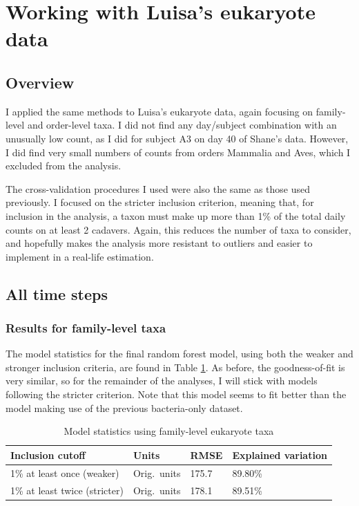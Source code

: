 \documentclass{article}
\begin{document}
\section{Working with Luisa's eukaryote data}

\subsection{Overview}

I applied the same methods to Luisa's eukaryote data, again focusing
on family-level and order-level taxa.  I did not find any day/subject
combination with an unusually low count, as I did for subject A3 on
day 40 of Shane's data.  However, I did find very small numbers of
counts from orders Mammalia and Aves, which I excluded from the
analysis.

The cross-validation procedures I used were also the same as those
used previously.  I focused on the stricter inclusion criterion,
meaning that, for inclusion in the analysis, a taxon must make up more
than 1\% of the total daily counts on at least 2 cadavers.  Again,
this reduces the number of taxa to consider, and hopefully makes the
analysis more resistant to outliers and easier to implement in a
real-life estimation.

\subsection{All time steps}

\subsubsection{Results for family-level taxa}

The model statistics for the final random forest model, using both the
weaker and stronger inclusion criteria, are found in Table
\ref{tbl:eukaryote_family_all_data_model_stats}.  As before, the
goodness-of-fit is very similar, so for the remainder of the analyses,
I will stick with models following the stricter criterion.  Note that
this model seems to fit better than the model making use of the
previous bacteria-only dataset.

\begin{table}
  \centering
\caption{\label{tbl:eukaryote_family_all_data_model_stats}Model statistics using family-level eukaryote taxa}
\begin{tabular}{llll}
Inclusion cutoff & Units  & RMSE & Explained variation\\ \hline
1\% at least once (weaker)  & Orig.~units & 175.7 & 89.80\%\\
1\% at least twice (stricter) & Orig.~units & 178.1 & 89.51\% 
\end{tabular}
\end{table}
\end{document}
